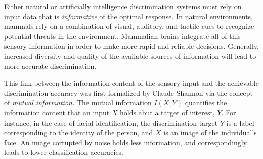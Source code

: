 
Either natural or artificially intelligence discrimination systems
must rely on input data that is \emph{informative} of the optimal
response.  In natural environments, mammals rely on a combination of
visual, auditory, and tactile cues to recognize potential threats in
the environment.  Mammalian brains integrate all of this sensory
information in order to make more rapid and reliable decisions.
Generally, increased diversity and quality of the available sources of
information will lead to more accurate discrimination.

This link between the information content of the sensory input and the
achievable discrimination accuracy was first formalized by Claude
Shannon via the concept of \emph{mutual information.}  The mutual
information $I(X; Y)$ quantifies the information content that an input
$X$ holds abut a target of interest, $Y$.  For instance, in the case
of facial identification, the discrimination target $Y$ is a label
corresponding to the identity of the person, and $X$ is an image of
the individual's face.  An image corrupted by noise holds less
information, and correspondingly leads to lower classification
accuracies.


